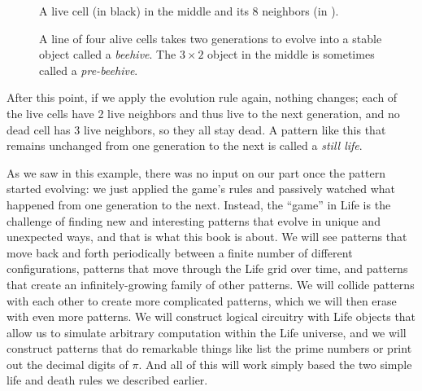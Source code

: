\begin{figure}[!htb]
	\centering
	\begin{minipage}[b]{0.38\textwidth}
		\centering
		\caption{A live cell (in black) in the middle and its 8 neighbors (in ).}\label{fig:neighborhood}
	\end{minipage}\hfill
	\begin{minipage}[b]{0.58\textwidth}
		\centering
		\caption{A line of four alive cells takes two generations to evolve into a stable object called a \emph{beehive}. The $3 \times 2$ object in the middle is sometimes called a \emph{pre-beehive}.}\label{fig:first_example}
	\end{minipage}
\end{figure}

After this point, if we apply the evolution rule again, nothing changes; each of the live cells have 2 live neighbors and thus live to the next generation, and no dead cell has 3 live neighbors, so they all stay dead. A pattern like this that remains unchanged from one generation to the next is called a \emph{still life}.

As we saw in this example, there was no input on our part once the pattern started evolving: we just applied the game's rules and passively watched what happened from one generation to the next. Instead, the ``game'' in Life is the challenge of finding new and interesting patterns that evolve in unique and unexpected ways, and that is what this book is about. We will see patterns that move back and forth periodically between a finite number of different configurations, patterns that move through the Life grid over time, and patterns that create an infinitely-growing family of other patterns. We will collide patterns with each other to create more complicated patterns, which we will then erase with even more patterns. We will construct logical circuitry with Life objects that allow us to simulate arbitrary computation within the Life universe, and we will construct patterns that do remarkable things like list the prime numbers or print out the decimal digits of $\pi$. And all of this will work simply based the two simple life and death rules we described earlier.

